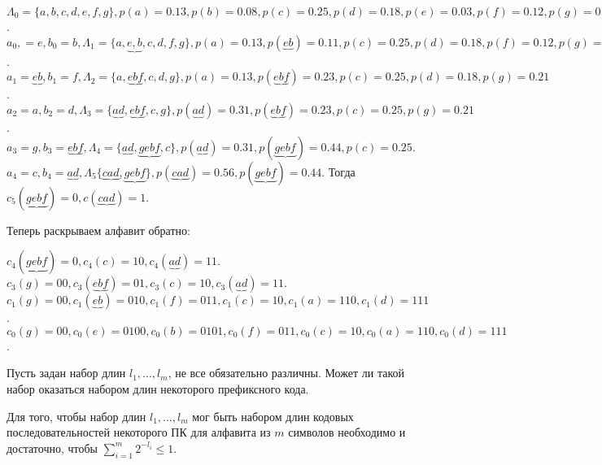 	\begin{Example}
		$\Lambda_0 = \{a, b, c, d, e, f, g\}, p(a) = 0.13, p(b) = 0.08, p(c) = 0.25, p(d) = 0.18, p(e) = 0.03, p(f) = 0.12, p(g) = 0.21$. \\
		$a_0, = e, b_0 = b, \Lambda_1 = \{a, \underbrace{e, b}, c, d, f, g\}, p(a) = 0.13, p(\underbrace{eb}) = 0.11, p(c) = 0.25, p(d) = 0.18, p(f) = 0.12, p(g) = 0.21$. \\
		$a_1 = \underbrace{eb}, b_1 = f, \Lambda_2 = \{a, \underbrace{ebf}, c, d, g\}, p(a) = 0.13, p(\underbrace{ebf}) = 0.23, p(c) = 0.25, p(d) = 0.18, p(g) = 0.21$. \\ 
		$a_2 = a, b_2 = d, \Lambda_3 = \{\underbrace{ad}, \underbrace{ebf}, c, g\}, p(\underbrace{ad}) = 0.31, p(\underbrace{ebf}) = 0.23, p(c) = 0.25, p(g) = 0.21$. \\
		$a_3 = g, b_3 = \underbrace{ebf}, \Lambda_4 = \{\underbrace{ad}, \underbrace{gebf}, c\}, p(\underbrace{ad}) = 0.31, p(\underbrace{gebf}) = 0.44, p(c) = 0.25$.
		$a_4 = c, b_4 = \underbrace{ad}, \Lambda_5 \{\underbrace{cad}, \underbrace{gebf}\}, p(\underbrace{cad}) = 0.56, p(\underbrace{gebf}) = 0.44$.
		Тогда $c_5(\underbrace{gebf}) = 0, c(\underbrace{cad}) = 1$.
		
		Теперь раскрываем алфавит обратно:
		
		$c_4 (\underbrace{gebf}) = 0, c_4(c) = 10, c_4(\underbrace{ad}) = 11$. \\
		$c_3(g) = 00, c_3(\underbrace{ebf}) = 01, c_3(c) = 10, c_3(\underbrace{ad}) = 11$. \\
		$c_1(g) = 00, c_1(\underbrace{eb}) = 010, c_1(f) = 011, c_1(c) = 10, c_1(a) = 110, c_1(d) = 111$. \\
		$c_0(g) = 00, c_0(e) = 0100, c_0(b) = 0101, c_0(f) = 011, c_0(c) = 10, c_0(a) = 110, c_0(d) = 111$.
		
	\end{Example}


	Пусть задан набор длин $l_1, ..., l_m$, не все обязательно различны. Может ли такой набор оказаться набором длин некоторого префиксного кода.

	\begin{Thm}
		Для того, чтобы набор длин $l_1, ..., l_m$ мог быть набором длин кодовых последовательностей некоторого ПК для алфавита из $m$ символов необходимо и достаточно, чтобы $\sum_{i = 1}^m 2^{-l_i} \leqslant 1$. 
	\end{Thm}

	\def\AuthorName{Ксения Кузьмина} 

